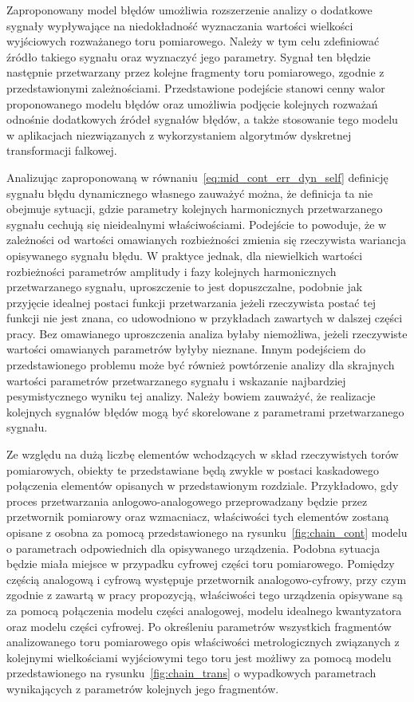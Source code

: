 Zaproponowany model błędów umożliwia rozszerzenie analizy o dodatkowe sygnały wypływające na niedokładność wyznaczania wartości wielkości wyjściowych rozważanego toru pomiarowego. Należy w tym celu zdefiniować źródło takiego sygnału oraz wyznaczyć jego parametry. Sygnał ten błędzie następnie przetwarzany przez kolejne fragmenty toru pomiarowego, zgodnie z przedstawionymi zależnościami. Przedstawione podejście stanowi cenny walor proponowanego modelu błędów oraz umożliwia podjęcie kolejnych rozważań odnośnie dodatkowych źródeł sygnałów błędów, a także stosowanie tego modelu w aplikacjach niezwiązanych z wykorzystaniem algorytmów dyskretnej transformacji falkowej.

Analizując zaproponowaną w równaniu~\eqref{eq:mid_cont_err_dyn_self} definicję sygnału błędu dynamicznego własnego zauważyć można, że definicja ta nie obejmuje sytuacji, gdzie parametry kolejnych harmonicznych przetwarzanego sygnału cechują się nieidealnymi właściwościami. Podejście to powoduje, że w zależności od wartości omawianych rozbieżności zmienia się rzeczywista wariancja opisywanego sygnału błędu. W praktyce jednak, dla niewielkich wartości rozbieżności parametrów amplitudy i fazy kolejnych harmonicznych przetwarzanego sygnału, uproszczenie to jest dopuszczalne, podobnie jak przyjęcie idealnej postaci funkcji przetwarzania jeżeli rzeczywista postać tej funkcji nie jest znana, co udowodniono w przykładach zawartych w dalszej części pracy. Bez omawianego uproszczenia analiza byłaby niemożliwa, jeżeli rzeczywiste wartości omawianych parametrów byłyby nieznane. Innym podejściem do przedstawionego problemu może być również powtórzenie analizy dla skrajnych wartości parametrów przetwarzanego sygnału i wskazanie najbardziej pesymistycznego wyniku tej analizy. Należy bowiem zauważyć, że realizacje kolejnych sygnałów błędów mogą być skorelowane z parametrami przetwarzanego sygnału.

Ze względu na dużą liczbę elementów wchodzących w skład rzeczywistych torów pomiarowych, obiekty te przedstawiane będą zwykle w postaci kaskadowego połączenia elementów opisanych w przedstawionym rozdziale. Przykładowo, gdy proces przetwarzania anlogowo-analogowego przeprowadzany będzie przez przetwornik pomiarowy oraz wzmacniacz, właściwości tych elementów zostaną opisane z osobna za pomocą przedstawionego na rysunku~\ref{fig:chain_cont} modelu o parametrach odpowiednich dla opisywanego urządzenia. Podobna sytuacja będzie miała miejsce w przypadku cyfrowej części toru pomiarowego. Pomiędzy częścią analogową i cyfrową występuje przetwornik analogowo-cyfrowy, przy czym zgodnie z zawartą w pracy propozycją, właściwości tego urządzenia opisywane są za pomocą połączenia modelu części analogowej, modelu idealnego kwantyzatora oraz modelu części cyfrowej. Po określeniu parametrów wszystkich fragmentów analizowanego toru pomiarowego opis właściwości metrologicznych związanych z kolejnymi wielkościami wyjściowymi tego toru jest możliwy za pomocą modelu przedstawionego na rysunku~\ref{fig:chain_trans} o wypadkowych parametrach wynikających z parametrów kolejnych jego fragmentów.

